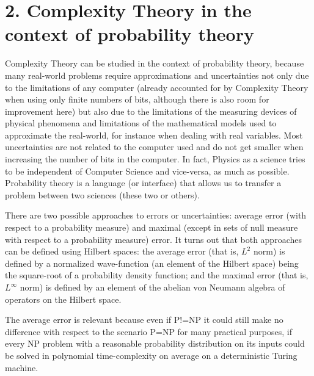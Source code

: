 \documentclass[11pt,a4paper]{report}
\begin{document}
\hypertarget{complexity-theory-in-the-context-of-probability-theory}{%
\section{2. Complexity Theory in the context of probability
theory}\label{complexity-theory-in-the-context-of-probability-theory}}

Complexity Theory can be studied in the context of probability
theory\cite{novak2008tractability}\cite{hennig2022probabilistic}\cite{ritter2000average}\cite{bna}, because many
real-world problems require approximations and uncertainties not only
due to the limitations of any computer (already accounted for by
Complexity Theory when using only finite numbers of bits, although there
is also room for improvement here) but also due to the limitations of
the measuring devices of physical phenomena and limitations of the
mathematical models used to approximate the real-world, for instance
when dealing with real variables. Most uncertainties are not related to
the computer used and do not get smaller when increasing the number of
bits in the computer. In fact, Physics as a science tries to be
independent of Computer Science and vice-versa, as much as possible.
Probability theory is a language (or interface) that allows us to
transfer a problem between two sciences (these two or others).

There are two possible approaches to errors or
uncertainties\cite{novak2008tractability}\cite{hennig2022probabilistic}\cite{ritter2000average}\cite{bna}: average error (with
respect to a probability measure) and maximal (except in sets of null
measure with respect to a probability measure) error. It turns out that
both approaches can be defined using Hilbert spaces: the average error
(that is, \(L^2\) norm) is defined by a normalized wave-function (an
element of the Hilbert space) being the square-root of a probability
density function; and the maximal error (that is, \(L^\infty\) norm) is
defined by an element of the abelian von Neumann algebra of operators on
the Hilbert space.

The average error is relevant because even if P!=NP it could still make
no difference with respect to the scenario P=NP for many practical
purposes, if every NP problem with a reasonable probability distribution
on its inputs could be solved in polynomial time-complexity on average
on a deterministic Turing
machine\cite{avcomplete}\cite{impagliazzo1995personal}.
\end{document}
